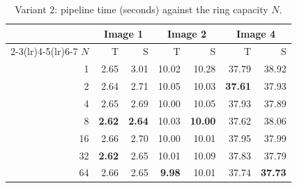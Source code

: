 \documentclass[11pt,a4paper]{article}
\begin{document}
\begin{table}[htbp]
\centering
\caption{Variant 2: pipeline time (seconds) against the ring capacity $N$.}
\label{tab:N-v2}
\begin{tabular}{r rr rr rr}
\toprule
& \multicolumn{2}{c}{Image 1} & \multicolumn{2}{c}{Image 2} & \multicolumn{2}{c}{Image 4} \\
\cmidrule(lr){2-3}\cmidrule(lr){4-5}\cmidrule(lr){6-7}
$N$ & T & S & T & S & T & S \\
\midrule
1 & 2.65 & 3.01 & 10.02 & 10.28 & 37.79 & 38.92 \\
2 & 2.64 & 2.71 & 10.05 & 10.03 & \textbf{37.61} & 37.93 \\
4 & 2.65 & 2.69 & 10.00 & 10.05 & 37.93 & 37.89 \\
8 & \textbf{2.62} & \textbf{2.64} & 10.03 & \textbf{10.00} & 37.62 & 38.06 \\
16 & 2.66 & 2.70 & 10.00 & 10.01 & 37.95 & 37.99 \\
32 & \textbf{2.62} & 2.65 & 10.01 & 10.09 & 37.83 & 37.79 \\
64 & 2.66 & 2.65 & \textbf{9.98} & 10.01 & 37.74 & \textbf{37.73} \\
\bottomrule
\end{tabular}
\end{table}
\end{document}
